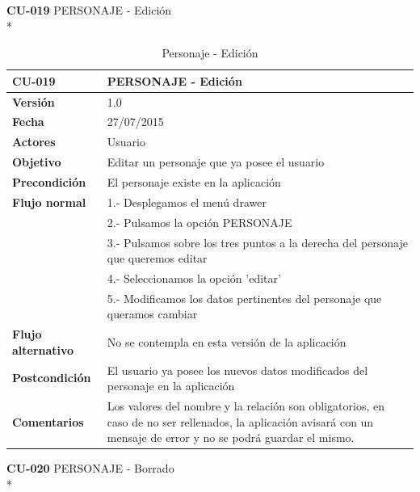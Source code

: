 \documentclass[../pfc.tex]{subfiles}
\begin{document}
		\clearpage
		
		\textbf{CU-019}	PERSONAJE - Edición\\*
		
		\begin{table}[H]
			\centering
			\begin{tabular}[t]{|p{3cm}|p{9.5cm}|}
				\hline \textbf{CU-019} & \textbf{PERSONAJE - Edición} \\*
				\hline\hline \textbf{Versión} & 1.0 \\*
				\hline\hline \textbf{Fecha} & 27/07/2015 \\*
				\hline\textbf{Actores} 	& Usuario\\*
				\hline \textbf{Objetivo} & Editar un personaje que ya posee el usuario\\* 			
				\hline \textbf{Precondición} & El personaje existe en la aplicación\\* 
				\hline \textbf{Flujo normal} & 1.- Desplegamos el menú drawer \\* 
				& 2.- Pulsamos la opción PERSONAJE\\*	
				& 3.- Pulsamos sobre los tres puntos a la derecha del personaje que queremos editar\\*	
				& 4.- Seleccionamos la opción 'editar'\\*	
				& 5.- Modificamos los datos pertinentes del personaje que queramos cambiar\\*	
				\hline \textbf{Flujo alternativo} & No se contempla en esta versión de la aplicación \\* 
				\hline \textbf{Postcondición} & El usuario ya posee los nuevos datos modificados del personaje en la aplicación \\* 
				\hline \textbf{Comentarios}   & Los valores del nombre y la relación son obligatorios, en caso de no ser rellenados, la aplicación avisará con un mensaje de error y no se podrá guardar el mismo.\\*
				\hline
			\end{tabular}
			\caption{Personaje - Edición}
			\label{tabla:caso019}
		\end{table}
		
		\textbf{CU-020}	PERSONAJE - Borrado\\*
		
\end{document}

